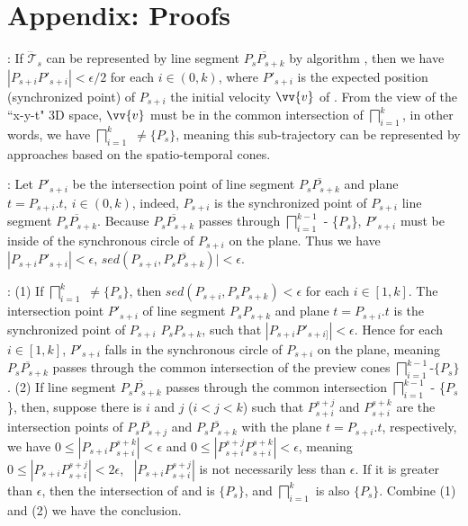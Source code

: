 \section*{{Appendix:  Proofs}}





:
If $\dddot{\mathcal{T}}_s$ can be represented by line segment $\overline{P_sP_{s+k}}$ by algorithm \ldrh, then we have $|P_{s+i}P'_{s+i}| < \epsilon/2$ for each $i \in (0, k)$, where $P'_{s+i}$ is the expected position (synchronized point) of $P_{s+i}$ \wrt the initial velocity $\vv{v}$ of \ldrh.
From the view of the ``x-y-t" 3D space, $\vv{v}$ must be in the common intersection of  $\bigsqcap_{i=1}^{k}$, in other words, we have $\bigsqcap_{i=1}^{k}$ $\ne \{P_s\}$, meaning this sub-trajectory can be represented by approaches based on the spatio-temporal cones.
\eop

:
Let $P'_{s+i}$ be the intersection point of line segment $\overline{P_sP_{s+k}}$ and plane $t = P_{s+i}.t,~i\in (0,k)$, indeed, $P_{s+i}$ is the synchronized point of $P_{s+i}$ \wrt line segment $\overline{P_sP_{s+k}}$. 
Because $\overline{P_sP_{s+k}}$ passes through $\bigsqcap_{i=1}^{k-1}$ - \{$P_s$\}, $P'_{s+i}$ must be inside of the synchronous circle of $P_{s+i}$ on the plane. Thus we have $|P_{s+i}P'_{s+i}|<\epsilon$, \ie $sed(P_{s+i}, \overline{P_sP_{s+k}})|<\epsilon$.
\eop

:
(1) If $\bigsqcap_{i=1}^{k}$ $\ne \{P_s\}$, then $sed(P_{s+i}, P_sP_{s+k}) <\epsilon$ for each $i \in [1,k]$. 
The intersection point  $P'_{s+i}$ of line segment $P_s P_{s+k}$ and plane $t = P_{s+i}.t$ is the synchronized point of $P_{s+i}$ \wrt $P_s P_{s+k}$, such that $|P_{s+i}P'_{s+i]}| < \epsilon$. Hence for each $i \in [1,k]$, $P'_{s+i}$ falls in the synchronous circle of $P_{s+i}$ on the plane, meaning $\overline{P_sP_{s+k}}$ passes through the common intersection of the preview cones $\bigsqcap_{i=1}^{k-1}$-$\{P_s\}$.
%
(2) If line segment $\overline{P_sP_{s+k}}$ passes through the common intersection $\bigsqcap_{i=1}^{k-1}$ - \{$P_s$\}, then, suppose there is $i$ and $j$ ($i<j<k$) such that $P^{s+j}_{s+i}$ and $P^{s+k}_{s+i}$ are the intersection points of $\overline{P_sP_{s+j}}$ and $\overline{P_sP_{s+k}}$ with the plane $t = P_{s+i}.t$, respectively, we have $0 \le |P_{s+i}P^{s+k}_{s+i}|<\epsilon$ and $0 \le |P^{s+j}_{s+i}P^{s+k}_{s+i}|<\epsilon$, meaning $0 \le |P_{s+i}P^{s+j}_{s+i}|<2\epsilon$, \ie~$|P_{s+i}P^{s+j}_{s+i}|$ is not necessarily less than $\epsilon$. 
%
If it is greater than $\epsilon$, then the intersection of  and  is $\{P_s\}$, and $\bigsqcap_{i=1}^{k}$ is also $\{P_s\}$.
%
Combine (1) and (2) we have the conclusion.
\eop

